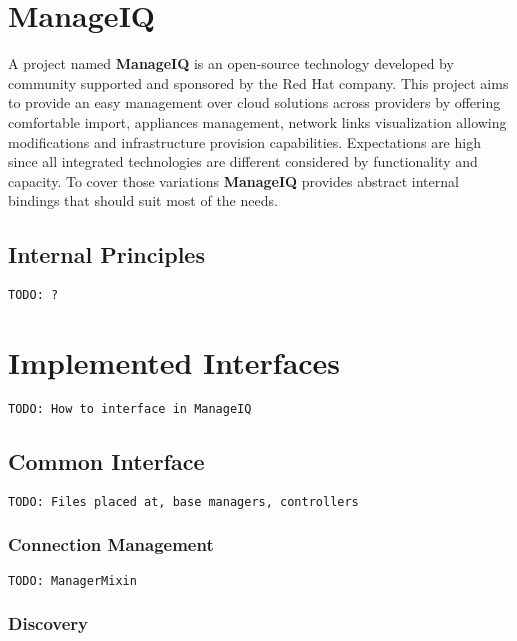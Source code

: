 \chapter{ManageIQ}
\label{chap:ManageIQ}

A project named \textbf{ManageIQ} is an open-source technology developed by community supported and sponsored by the Red Hat company. This project aims to provide an easy management over cloud solutions across providers by offering comfortable import, appliances management, network links visualization allowing modifications and infrastructure provision capabilities. Expectations are high since all integrated technologies are different considered by functionality and capacity. To cover those variations \textbf{ManageIQ} provides abstract internal bindings that should suit most of the needs.

\section{Internal Principles}
\label{sec:Internal Principles}


\noindent\texttt{\color{OliveGreen}TODO: ?}

\chapter{Implemented Interfaces}
\label{chap:Implemented Interfaces}

\noindent\texttt{\color{OliveGreen}TODO: How to interface in ManageIQ}

\section{Common Interface}
\label{sec:Common Interface}

\noindent\texttt{\color{OliveGreen}TODO: Files placed at, base managers, controllers}

\subsection{Connection Management}
\label{sub:Connection Management}

\noindent\texttt{\color{OliveGreen}TODO: ManagerMixin}

\subsection{Discovery}
\label{sub:Discovery}


